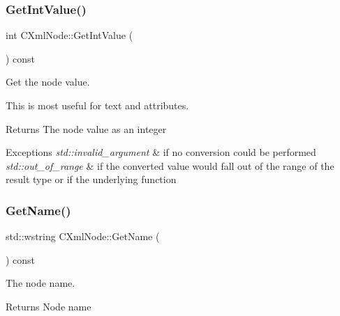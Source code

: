 \subsubsection{\texorpdfstring{Get\+Int\+Value()}{GetIntValue()}}
{\footnotesize\ttfamily int C\+Xml\+Node\+::\+Get\+Int\+Value (\begin{DoxyParamCaption}{ }\end{DoxyParamCaption}) const}



Get the node value. 

This is most useful for text and attributes. \begin{DoxyReturn}{Returns}
The node value as an integer 
\end{DoxyReturn}

\begin{DoxyExceptions}{Exceptions}
{\em std\+::invalid\+\_\+argument} & if no conversion could be performed \\
\hline
{\em std\+::out\+\_\+of\+\_\+range} & if the converted value would fall out of the range of the result type or if the underlying function \\
\hline
\end{DoxyExceptions}
\mbox{\label{classxmlnode_1_1_c_xml_node_a84d2553bd71bde08ee2a65fb1eedf3a4}} 
\subsubsection{\texorpdfstring{Get\+Name()}{GetName()}}
{\footnotesize\ttfamily std\+::wstring C\+Xml\+Node\+::\+Get\+Name (\begin{DoxyParamCaption}{ }\end{DoxyParamCaption}) const}



The node name. 

\begin{DoxyReturn}{Returns}
Node name 
\end{DoxyReturn}
\mbox{\label{classxmlnode_1_1_c_xml_node_ab455bd55e7f3dbd550e81d7fe293d146}} 
